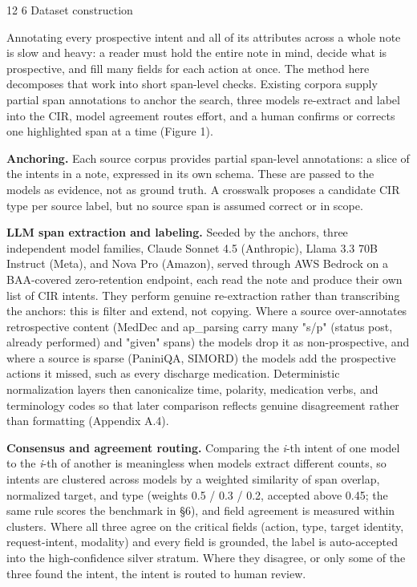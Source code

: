 \documentclass[3p,twocolumn]{elsarticle}
\makeatletter
\renewcommand\section{\@startsection {section}{1}{\z@}%
    {12\p@ \@plus 4\p@ \@minus 4\p@}%
    {6\p@ \@plus 4\p@ \@minus 3\p@}%
    {\normalsize\bfseries\boldmath}}
\makeatother
\begin{document}
\section{Dataset construction}\label{dataset-construction}

Annotating every prospective intent and all of its attributes across a whole note is slow and heavy: a reader must hold the entire note in mind, decide what is prospective, and fill many fields for each action at once. The method here decomposes that work into short span-level checks. Existing corpora supply partial span annotations to anchor the search, three models re-extract and label into the CIR, model agreement routes effort, and a human confirms or corrects one highlighted span at a time (Figure 1).

\textbf{Anchoring.} Each source corpus provides partial span-level annotations: a slice of the intents in a note, expressed in its own schema. These are passed to the models as evidence, not as ground truth. A crosswalk proposes a candidate CIR type per source label, but no source span is assumed correct or in scope.

\textbf{LLM span extraction and labeling.} Seeded by the anchors, three independent model families, Claude Sonnet 4.5 (Anthropic), Llama 3.3 70B Instruct (Meta), and Nova Pro (Amazon), served through AWS Bedrock on a BAA-covered zero-retention endpoint, each read the note and produce their own list of CIR intents. They perform genuine re-extraction rather than transcribing the anchors: this is filter and extend, not copying. Where a source over-annotates retrospective content (MedDec and ap\_parsing carry many "s/p" (status post, already performed) and "given" spans) the models drop it as non-prospective, and where a source is sparse (PaniniQA, SIMORD) the models add the prospective actions it missed, such as every discharge medication. Deterministic normalization layers then canonicalize time, polarity, medication verbs, and terminology codes so that later comparison reflects genuine disagreement rather than formatting (Appendix A.4).

\textbf{Consensus and agreement routing.} Comparing the \emph{i}-th intent of one model to the \emph{i}-th of another is meaningless when models extract different counts, so intents are clustered across models by a weighted similarity of span overlap, normalized target, and type (weights 0.5 / 0.3 / 0.2, accepted above 0.45; the same rule scores the benchmark in §6), and field agreement is measured within clusters. Where all three agree on the critical fields (action, type, target identity, request-intent, modality) and every field is grounded, the label is auto-accepted into the high-confidence silver stratum. Where they disagree, or only some of the three found the intent, the intent is routed to human review.
\end{document}
